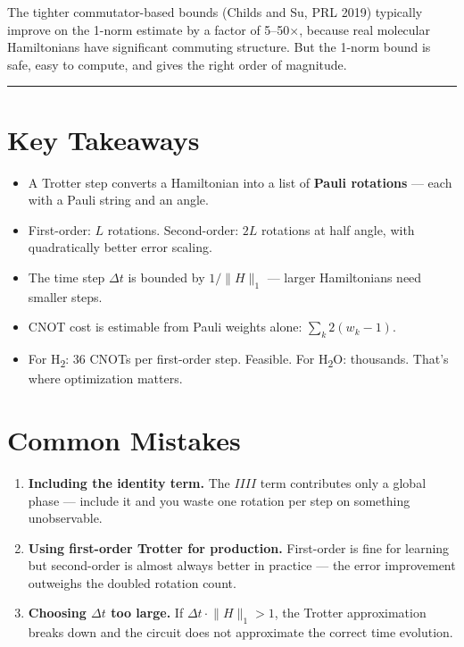 \documentclass[
  11pt,
  oneside]{book}
\providecommand{\tightlist}{%
  \setlength{\itemsep}{0pt}\setlength{\parskip}{0pt}}
\begin{document}
The tighter commutator-based bounds (Childs and Su, PRL 2019) typically
improve on the 1-norm estimate by a factor of 5--50$\times$, because real
molecular Hamiltonians have significant commuting structure. But the
1-norm bound is safe, easy to compute, and gives the right order of
magnitude.

\begin{center}\rule{0.5\linewidth}{0.5pt}\end{center}

\section{Key Takeaways}\label{key-takeaways-14}

\begin{itemize}
\tightlist
\item
  A Trotter step converts a Hamiltonian into a list of \textbf{Pauli
  rotations} --- each with a Pauli string and an angle.
\item
  First-order: \(L\) rotations. Second-order: \(2L\) rotations at half
  angle, with quadratically better error scaling.
\item
  The time step \(\Delta t\) is bounded by \(1/\lVert H \rVert_1\) ---
  larger Hamiltonians need smaller steps.
\item
  CNOT cost is estimable from Pauli weights alone:
  \(\sum_k 2(w_k - 1)\).
\item
  For H\textsubscript{2}: 36 CNOTs per first-order step. Feasible. For H\textsubscript{2}O: thousands.
  That's where optimization matters.
\end{itemize}

\section{Common Mistakes}\label{common-mistakes-10}

\begin{enumerate}
\def\labelenumi{\arabic{enumi}.}
\item
  \textbf{Including the identity term.} The \(IIII\) term contributes
  only a global phase --- include it and you waste one rotation per step
  on something unobservable.
\item
  \textbf{Using first-order Trotter for production.} First-order is fine
  for learning but second-order is almost always better in practice ---
  the error improvement outweighs the doubled rotation count.
\item
  \textbf{Choosing \(\Delta t\) too large.} If
  \(\Delta t \cdot \lVert H \rVert_1 > 1\), the Trotter approximation
  breaks down and the circuit does not approximate the correct time
  evolution.
\end{enumerate}
\end{document}
